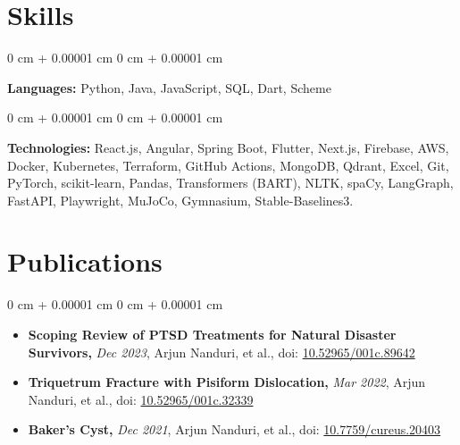 \documentclass[10pt, letterpaper]{article}
\newenvironment{highlights}{
    \begin{itemize}[
        topsep=0.3 cm,
        parsep=0.05 cm,
        partopsep=0pt,
        itemsep=0.02 cm,
        leftmargin=0 cm + 10pt
    ]
}{
    \end{itemize}
} %
\newenvironment{onecolentry}{
    \begin{adjustwidth}{
        0 cm + 0.00001 cm
    }{
        0 cm + 0.00001 cm
    }
}{
    \end{adjustwidth}
} %
\begin{document}
    \section{Skills}

        \begin{onecolentry}
            \textbf{Languages:} Python, Java, JavaScript, SQL, Dart, Scheme
        \end{onecolentry}

        \vspace{0.10 cm}

        \begin{onecolentry}
            \textbf{Technologies:} React.js, Angular, Spring Boot, Flutter, Next.js, Firebase, AWS, Docker, Kubernetes, Terraform, GitHub Actions, MongoDB, Qdrant, Excel, Git, PyTorch, scikit-learn, Pandas, Transformers (BART), NLTK, spaCy, LangGraph, FastAPI, Playwright, MuJoCo, Gymnasium, Stable-Baselines3.
        \end{onecolentry}

    \section{Publications}

        \begin{onecolentry}
            \begin{highlights}
                \item \textbf{Scoping Review of PTSD Treatments for Natural Disaster Survivors,} \textit{Dec 2023}, Arjun Nanduri, et al., doi: \href{https://doi.org/10.52965/001c.89642}{10.52965/001c.89642}
                \item \textbf{Triquetrum Fracture with Pisiform Dislocation,} \textit{Mar 2022}, Arjun Nanduri, et al., doi: \href{https://doi.org/10.52965/001c.32339}{10.52965/001c.32339}
                \item \textbf{Baker's Cyst,} \textit{Dec 2021}, Arjun Nanduri, et al., doi: \href{https://doi.org/10.7759/cureus.20403}{10.7759/cureus.20403}
            \end{highlights}
        \end{onecolentry}
\end{document}
